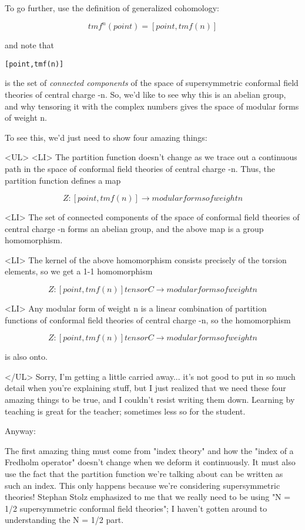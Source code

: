 To go further, use the definition of generalized cohomology:

$$
tmf^{n}(point) = [point,tmf(n)]
$$
    
and note that
 
\begin{verbatim}
[point,tmf(n)] 
\end{verbatim}
    
is the set of \emph{connected components} of the space of supersymmetric
conformal field theories of central charge -n.  So, we'd like to 
see why this is an abelian group, and why tensoring it with
the complex numbers gives the space of modular forms of weight n.

To see this, we'd just need to show four amazing things:

<UL>
<LI> The partition function doesn't change as we trace out
a continuous path in the space of conformal field theories
of central charge -n.  Thus, the partition function defines
a map

$$
Z: [point,tmf(n)] \to  {modular forms of weight n}
$$
    

<LI> The set of connected components of the space of conformal
field theories of central charge -n forms an abelian group, 
and the above map is a group homomorphism.

<LI> The kernel of the above homomorphism consists precisely of
the torsion elements, so we get a 1-1 homomorphism
 
$$
Z: [point,tmf(n)] tensor C \to  {modular forms of weight n}
$$
    
<LI> Any modular form of weight n is a linear combination of
partition functions of conformal field theories of central
charge -n, so the homomorphism

$$
Z: [point,tmf(n)] tensor C \to  {modular forms of weight n}
$$
    
is also onto.

</UL>
Sorry, I'm getting a little carried away... it's not good to 
put in so much detail when you're explaining stuff, but I 
just realized that we need these four amazing things to be true, 
and I couldn't resist writing them down.  Learning by teaching
is great for the teacher; sometimes less so for the student.  

Anyway: 

The first amazing thing must come from "index theory" and how the
"index of a Fredholm operator" doesn't change when we deform 
it continuously.  It must also use the fact that the partition
function we're talking about can be written as such an index.  This 
only happens because we're considering supersymmetric theories!
Stephan Stolz emphasized to me that we really need to be using 
"N = 1/2 supersymmetric conformal field theories"; I haven't
gotten around to understanding the N = 1/2 part.

